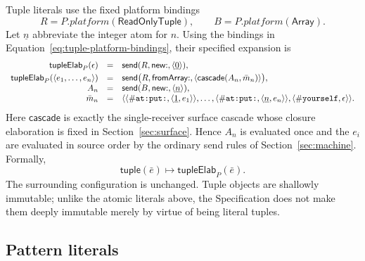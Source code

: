 \documentclass[11pt]{article}
\numberwithin{equation}{section}
\newcommand{\kw}[1]{\ensuremath{\mathsf{#1}}}
\newcommand{\kws}[1]{\ensuremath{\mathsf{#1\mathord{:}}}}
\newcommand{\selsym}[1]{\ensuremath{\mathord{\#}\text{\texttt{#1}}}}
\begin{document}
Tuple literals use the fixed platform bindings
\begin{equation}\label{eq:tuple-platform-bindings}
 R=P.\mathit{platform}(\kw{ReadOnlyTuple}),\qquad
 B=P.\mathit{platform}(\kw{Array}).
\end{equation}
Let $\underline n$ abbreviate the integer atom for $n$.  Using the bindings in
Equation~\eqref{eq:tuple-platform-bindings}, their specified expansion is
\begin{equation}\label{eq:tuple-expansion}
\begin{array}{rcl}
 \mathsf{tupleElab}_P(\epsilon)
  &=&\kw{send}(R,\kws{new},\langle\underline0\rangle),\\[1mm]
 \mathsf{tupleElab}_P(\langle e_1,\ldots,e_n\rangle)
  &=&\kw{send}\bigl(R,\kws{fromArray},
       \langle\mathsf{cascade}(A_n,\bar m_n)\rangle\bigr),\\
 A_n&=&\kw{send}(B,\kws{new},\langle\underline n\rangle),\\
 \bar m_n&=&\langle
   \langle\selsym{at:put:},\langle\underline1,e_1\rangle\rangle,\ldots,
   \langle\selsym{at:put:},\langle\underline n,e_n\rangle\rangle,
   \langle\selsym{yourself},\epsilon\rangle\rangle.
\end{array}
\end{equation}
Here $\mathsf{cascade}$ is exactly the single-receiver surface cascade whose
closure elaboration is fixed in Section~\ref{sec:surface}.  Hence $A_n$ is
evaluated once and the $e_i$ are evaluated in source order by the ordinary
send rules of Section~\ref{sec:machine}.  Formally,
\begin{equation}\label{eq:tuple-step}
 \kw{tuple}(\bar e)\longmapsto\mathsf{tupleElab}_P(\bar e).
\end{equation}
The surrounding configuration is unchanged.  Tuple objects are shallowly
immutable; unlike the atomic literals above, the Specification does not make
them deeply immutable merely by virtue of being literal tuples.

\subsection{Pattern literals}
\label{sec:patterns}
\end{document}
